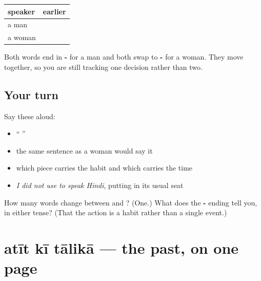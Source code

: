 \begin{grammarlens}[title={Grammar Lens: both halves bend}]
\noindent
\begin{tabularx}{\linewidth}{@{}>{\raggedright\arraybackslash}X>{\raggedright\arraybackslash}X@{}}
\toprule
\textbf{speaker} & \textbf{earlier} \\
\midrule
a man & \hi{मैं} \hi{हिंदी} \hi{बोलता} \hi{था।} \\
a woman & \hi{मैं} \hi{हिंदी} \hi{बोलती} \hi{थी।} \\
\bottomrule
\end{tabularx}

Both words end in \textbf{-} for a man and both swap to \textbf{-} for a woman. They move together, so you are still tracking one decision rather than two.
\end{grammarlens}

\subsection*{Your turn}
Say these aloud:

\begin{itemize}
\raggedright
  \item \textquotedblleft{}   \textquotedblright{}
  \item the same sentence as a woman would say it
  \item which piece carries the habit and which carries the time
  \item \emph{I did not use to speak Hindi}, putting  in its usual seat
\end{itemize}

\begin{tcolorbox}[breakable,colback=teal!4,colframe=teal!35!black,title={Before you move on}]
How many words change between \emph{ } and \emph{ }? (One.) What does the \textbf{-} ending tell you, in either tense? (That the action is a habit rather than a single event.)
\end{tcolorbox}
\section[\texorpdfstring{\hi{अतीत} \hi{की} \hi{तालिका} (atīt kī tālikā)}{अतीत की तालिका (atīt kī tālikā)}]{atīt kī tālikā — the past, on one page}

\label{lesson:HI-C87-repaso-atit}



